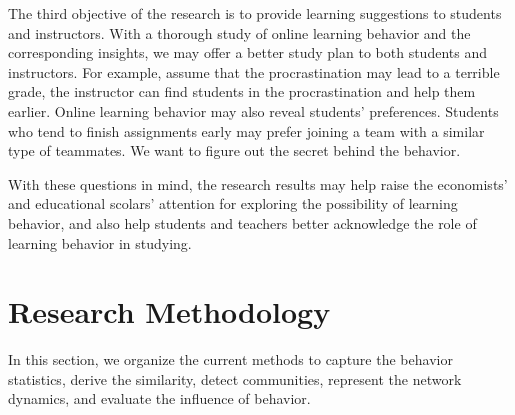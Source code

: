 \documentclass[a4paper]{article}
\theoremstyle{plain}
\begin{document}
The third objective of the research is to provide learning suggestions to students and instructors.
With a thorough study of online learning behavior and the corresponding insights,
we may offer a better study plan to both students and instructors. For example,
assume that the procrastination may lead to a terrible grade, the instructor can find students
in the procrastination and help them earlier.
Online learning behavior may also reveal students' preferences. Students who tend to 
finish assignments early may prefer joining a team with a similar type
of teammates. We want to figure out the secret behind the behavior.

With these questions in mind, the research results may help raise the economists' and 
educational scolars' attention for exploring the possibility of learning behavior,
and also help students and teachers better acknowledge the role of learning behavior in studying.


%
%
%
%
%

\section{Research Methodology}
In this section, we organize the current methods to 
capture the behavior statistics, derive the similarity, detect communities,
represent the network dynamics, and evaluate the influence of behavior.
\end{document}
